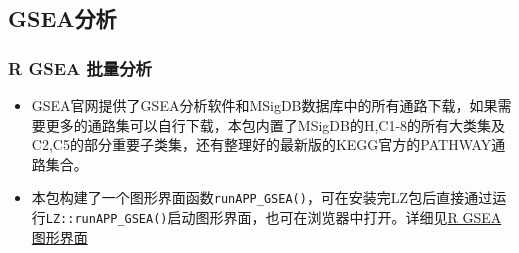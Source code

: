 \documentclass[
]{book}
\begin{document}
\subsection{GSEA分析}\label{enrich-gsea}

\subsubsection{R GSEA 批量分析}\label{r-gsea-ux6279ux91cfux5206ux6790}

\begin{itemize}
\item
  GSEA官网提供了GSEA分析软件和MSigDB数据库中的所有通路下载，如果需要更多的通路集可以自行下载，本包内置了MSigDB的H,C1-8的所有大类集及C2,C5的部分重要子类集，还有整理好的最新版的KEGG官方的PATHWAY通路集合。
\item
  本包构建了一个图形界面函数\texttt{runAPP\_GSEA()}，可在安装完LZ包后直接通过运行\texttt{LZ::runAPP\_GSEA()}启动图形界面，也可在浏览器中打开。详细见\hyperref[enrich-gsea-r.gsea.gui]{R GSEA 图形界面}
\end{itemize}
\end{document}
